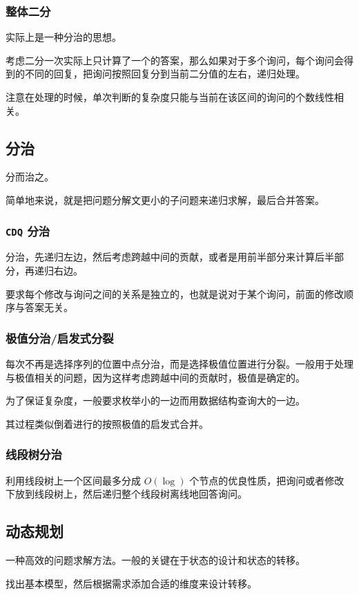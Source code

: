 \documentclass[UTF-8]{ctexart}
\begin{document}
	\subsubsection{整体二分}
	实际上是一种分治的思想。
	
	考虑二分一次实际上只计算了一个的答案，那么如果对于多个询问，每个询问会得到的不同的回复，把询问按照回复分到当前二分值的左右，递归处理。
	
	注意在处理的时候，单次判断的复杂度只能与当前在该区间的询问的个数线性相关。
	
	\subsection{分治}
	分而治之。
	
	简单地来说，就是把问题分解文更小的子问题来递归求解，最后合并答案。
	
	\subsubsection{\texttt{CDQ} 分治}
	分治，先递归左边，然后考虑跨越中间的贡献，或者是用前半部分来计算后半部分，再递归右边。
	
	要求每个修改与询问之间的关系是独立的，也就是说对于某个询问，前面的修改顺序与答案无关。
	
	\subsubsection{极值分治/启发式分裂}
	每次不再是选择序列的位置中点分治，而是选择极值位置进行分裂。一般用于处理与极值相关的问题，因为这样考虑跨越中间的贡献时，极值是确定的。
	
	为了保证复杂度，一般要求枚举小的一边而用数据结构查询大的一边。
	
	其过程类似倒着进行的按照极值的启发式合并。
	\subsubsection{线段树分治}
	利用线段树上一个区间最多分成 $O(\log)$ 个节点的优良性质，把询问或者修改下放到线段树上，然后递归整个线段树离线地回答询问。
	
	\subsection{动态规划}
	一种高效的问题求解方法。一般的关键在于状态的设计和状态的转移。
	
	找出基本模型，然后根据需求添加合适的维度来设计转移。
	
\end{document}
